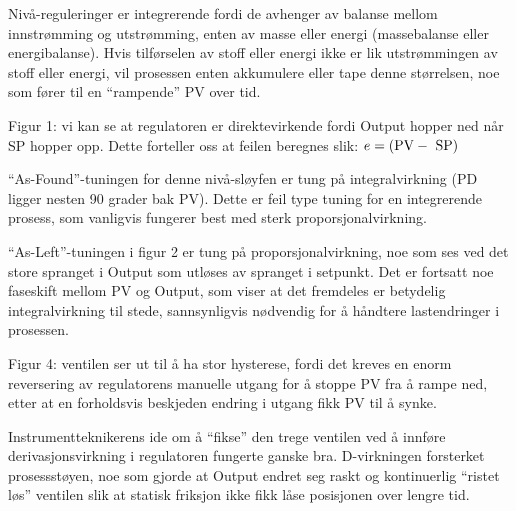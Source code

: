 












Nivå-reguleringer er integrerende fordi de avhenger av balanse mellom innstrømming og utstrømming, enten av masse eller energi (massebalanse eller energibalanse). Hvis tilførselen av stoff eller energi ikke er lik utstrømmingen av stoff eller energi, vil prosessen enten akkumulere eller tape denne størrelsen, noe som fører til en ``rampende'' PV over tid.

\vskip 10pt

Figur 1: vi kan se at regulatoren er direktevirkende fordi Output hopper ned når SP hopper opp. Dette forteller oss at feilen beregnes slik: $e = (\hbox{PV} - \hbox{ SP})$

\vskip 10pt

``As-Found''-tuningen for denne nivå-sløyfen er tung på integralvirkning (PD ligger nesten 90 grader bak PV). Dette er feil type tuning for en integrerende prosess, som vanligvis fungerer best med sterk proporsjonalvirkning.

\vskip 10pt

``As-Left''-tuningen i figur 2 er tung på proporsjonalvirkning, noe som ses ved det store spranget i Output som utløses av spranget i setpunkt. Det er fortsatt noe faseskift mellom PV og Output, som viser at det fremdeles er betydelig integralvirkning til stede, sannsynligvis nødvendig for å håndtere lastendringer i prosessen.

\vskip 10pt

Figur 4: ventilen ser ut til å ha stor hysterese, fordi det kreves en enorm reversering av regulatorens manuelle utgang for å stoppe PV fra å rampe ned, etter at en forholdsvis beskjeden endring i utgang fikk PV til å synke.

\vskip 10pt

Instrumentteknikerens ide om å ``fikse'' den trege ventilen ved å innføre derivasjonsvirkning i regulatoren fungerte ganske bra. D-virkningen forsterket prosessstøyen, noe som gjorde at Output endret seg raskt og kontinuerlig ``ristet løs'' ventilen slik at statisk friksjon ikke fikk låse posisjonen over lengre tid.














